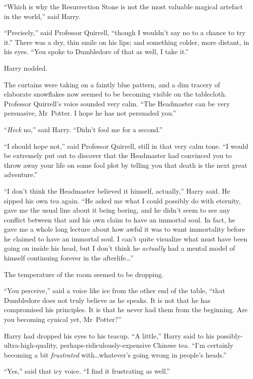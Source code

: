 “Which is why the Resurrection Stone is not the most valuable magical artefact in the world,” said Harry.

“Precisely,” said Professor Quirrell, “though I wouldn’t say no to a chance to try it.” There was a dry, thin smile on his lips; and something colder, more distant, in his eyes.
“You spoke to Dumbledore of that as well, I take it.”

Harry nodded.

The curtains were taking on a faintly blue pattern, and a dim tracery of elaborate snowflakes now seemed to be becoming visible on the tablecloth. Professor Quirrell’s voice sounded very calm.
“The Headmaster can be very persuasive, Mr~Potter. I hope he has not persuaded you.”

“\emph{Heck} no,” said Harry.
“Didn’t fool me for a second.”

“I should hope not,” said Professor Quirrell, still in that very calm tone.
“I would be extremely put out to discover that the Headmaster had convinced you to throw away your life on some fool plot by telling you that death is the next great adventure.”

“I don’t think the Headmaster believed it himself, actually,” Harry said. He sipped his own tea again.
“He asked me what I could possibly do with eternity, gave me the usual line about it being boring, and he didn’t seem to see any conflict between that and his own claim to have an immortal soul. In fact, he gave me a whole long lecture about how awful it was to want immortality before he claimed to have an immortal soul. I can’t quite visualize what must have been going on inside his head, but I don’t think he \emph{actually} had a mental model of himself continuing forever in the afterlife…”

The temperature of the room seemed to be dropping.

“You perceive,” said a voice like ice from the other end of the table, “that Dumbledore does not truly believe as he speaks. It is not that he has compromised his principles. It is that he never had them from the beginning. Are you becoming cynical yet, Mr~Potter?”

Harry had dropped his eyes to his teacup.
“A little,” Harry said to his possibly-ultra-high-quality, perhaps-ridiculously-expensive Chinese tea.
“I’m certainly becoming a bit \emph{frustrated} with…whatever’s going wrong in people’s heads.”

“Yes,” said that icy voice.
“I find it frustrating as well.”

